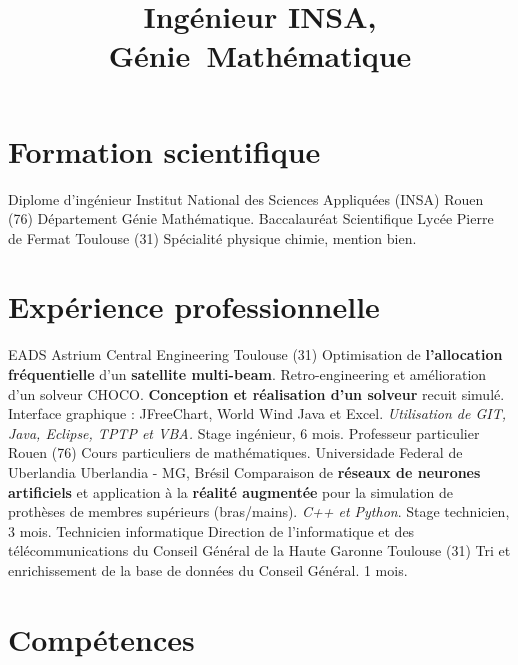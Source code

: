 \documentclass[10pt,a4paper,sans]{moderncv}%
\title{Ingénieur INSA, \mbox{Génie Mathématique}}
\begin{document}
\maketitle

\section{Formation scientifique}
    {Diplome d'ingénieur}
    {Institut National des Sciences Appliquées (INSA)}
    {Rouen (76)}{}
    {Département Génie Mathématique.}
    {Baccalauréat Scientifique}
    {Lycée Pierre de Fermat}
    {Toulouse (31)}{}
    {Spécialité physique chimie, mention bien.}

\section{Expérience professionnelle}
    {EADS Astrium Central Engineering}{}
    {Toulouse (31)}{}
    {Optimisation de \textbf{l'allocation fréquentielle} d'un \textbf{satellite multi-beam}. Retro-engineering et amélioration d'un solveur CHOCO. \textbf{Conception et réalisation d'un solveur} recuit simulé. Interface graphique : JFreeChart, World Wind Java et Excel. \textit{Utilisation  de GIT, Java, Eclipse, TPTP et VBA.} Stage ingénieur, 6 mois.}
    {Professeur particulier}{}
    {Rouen (76)}{}
    {Cours particuliers de mathématiques.}
    {Universidade Federal de Uberlandia}{}
    {Uberlandia - MG, Brésil}{}
    {Comparaison de \textbf{réseaux de neurones artificiels} et application à la \textbf{réalité augmentée} pour la simulation de prothèses de membres supérieurs (bras/mains). \textit{C++ et Python}. Stage technicien, 3 mois.}
    {Technicien informatique}
    {Direction de l'informatique et des télécommunications du Conseil Général de la Haute Garonne}
    {Toulouse (31)}{}
    {Tri et enrichissement de la base de données du Conseil Général. 1 mois.}

\section{Compétences}
\end{document}

